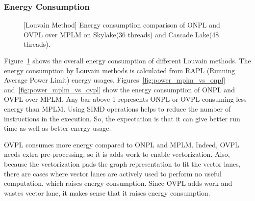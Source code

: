 \documentclass[default,iicol]{sn-jnl}%
\theoremstyle{thmstyleone}%
\theoremstyle{thmstyletwo}%
\theoremstyle{thmstylethree}%
\begin{document}
\subsubsection{Energy Consumption}
\begin{figure}[t]
      \centering
      \caption{[Louvain Method] Energy consumption comparison of ONPL and OVPL over MPLM on Skylake(36 threads) and Cascade Lake(48 threads).}   
      \label{fig:power_on_skylake_cascade}
 \end{figure}

Figure~\ref{fig:power_on_skylake_cascade} shows the overall energy
consumption of different Louvain methods.  The energy consumption by
Louvain methods is calculated from RAPL (Running Average Power Limit)
energy usages.  Figures~\ref{fig:power_mplm_vs_onpl}
and~\ref{fig:power_mplm_vs_ovpl} show the energy consumption of ONPL
and OVPL over MPLM. Any bar above 1 represents ONPL or OVPL consuming
less energy than MPLM. Using SIMD operations helps to reduce the
number of instructions in the execution. So, the expectation is that it
can give better run time as well as better energy usage.

OVPL consumes more energy compared to ONPL and MPLM. Indeed, OVPL
needs extra pre-processing, so it is adds work to enable
vectorization. Also, because the vectorization pads the graph
representation to fit the vector lanes, there are cases where vector
lanes are actively used to perform no useful computation, which raises
energy consumption. Since OVPL adds work and wastes vector lane, it
makes sense that it raises energy consumption.
\end{document}
